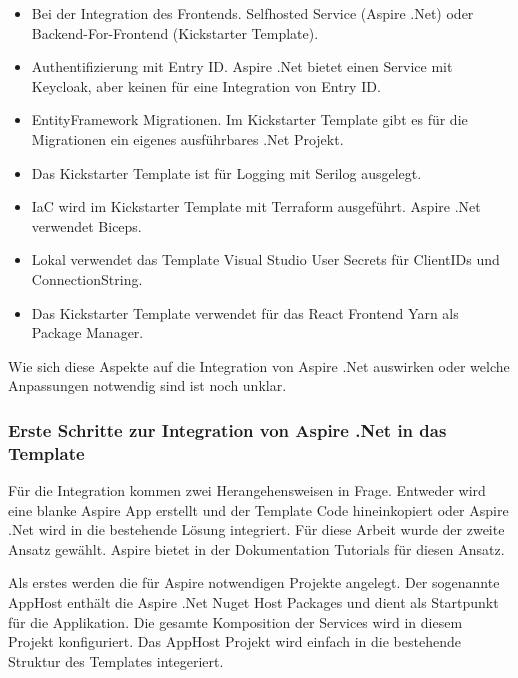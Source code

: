             \begin{itemize}
                \item Bei der Integration des Frontends. Selfhosted Service (Aspire .Net) oder Backend-For-Frontend (Kickstarter Template).
                \item Authentifizierung mit Entry ID. Aspire .Net bietet einen Service mit Keycloak, aber keinen für eine Integration von Entry ID.
                \item EntityFramework Migrationen. Im Kickstarter Template gibt es für die Migrationen ein eigenes ausführbares .Net Projekt.
                \item Das Kickstarter Template ist für Logging mit Serilog ausgelegt.
                \item IaC wird im Kickstarter Template mit Terraform ausgeführt. Aspire .Net verwendet Biceps.
                \item Lokal verwendet das Template Visual Studio User Secrets für ClientIDs und ConnectionString.
                \item Das Kickstarter Template verwendet für das React Frontend Yarn als Package Manager.
            \end{itemize}

            Wie sich diese Aspekte auf die Integration von Aspire .Net auswirken oder welche Anpassungen notwendig sind ist noch unklar.

        \subsubsection{Erste Schritte zur Integration von Aspire .Net in das Template}

            Für die Integration kommen zwei Herangehensweisen in Frage. Entweder wird eine blanke Aspire App erstellt und der Template Code hineinkopiert oder Aspire .Net wird in die bestehende Lösung integriert. Für diese Arbeit wurde der zweite Ansatz gewählt. Aspire bietet in der Dokumentation Tutorials für diesen Ansatz.

            Als erstes werden die für Aspire notwendigen Projekte angelegt. Der sogenannte AppHost enthält die Aspire .Net Nuget Host Packages und dient als Startpunkt für die Applikation. Die gesamte Komposition der Services wird in diesem Projekt konfiguriert. Das AppHost Projekt wird einfach in die bestehende Struktur des Templates integeriert.

